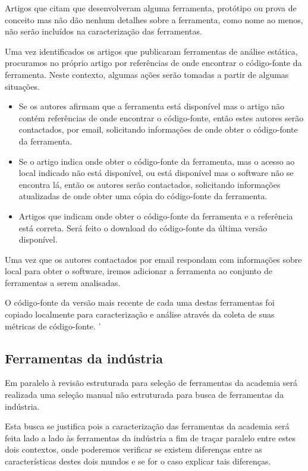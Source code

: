 Artigos que citam que desenvolveram alguma ferramenta, protótipo ou prova de
conceito mas não dão nenhum detalhes sobre a ferramenta, como nome ao menos,
não serão incluídos na caracterização das ferramentas.

Uma vez identificados os artigos que publicaram ferramentas de análise
estática, procuramos no próprio artigo por referências de onde encontrar o
código-fonte da ferramenta. Neste contexto, algumas ações serão tomadas a
partir de algumas situações.

\begin{itemize}

  \item Se os autores afirmam que a ferramenta está disponível mas o artigo
    não contém referências de onde encontrar o código-fonte, então estes
    autores serão contactados, por email, solicitando informações de onde
    obter o código-fonte da ferramenta.

  \item Se o artigo indica onde obter o código-fonte da ferramenta, mas o acesso ao local
    indicado não está disponível, ou está disponível mas o software não se
    encontra lá, então os autores serão contactados, solicitando informações
    atualizadas de onde obter uma cópia do código-fonte da ferramenta.

  \item Artigos que indicam onde obter o código-fonte da ferramenta e a referência
    está correta. Será feito o download do código-fonte da última versão
    disponível.

\end{itemize}

Uma vez que os autores contactados por email respondam com informações sobre
local para obter o software, iremos adicionar a ferramenta ao conjunto de ferramentas
a serem analisadas.

O código-fonte da versão mais recente de cada uma destas ferramentas foi
copiado localmente para caracterização e análise através da coleta de suas
métricas de código-fonte.
'
\subsection{Ferramentas da indústria}

Em paralelo à revisão estruturada para seleção de ferramentas da academia
será realizada uma seleção manual não estruturada para busca de ferramentas da indústria.

Esta busca se justifica pois a caracterização das ferramentas da academia será feita lado a
lado às ferramentas da indústria a fim de traçar paralelo entre estes dois contextos, onde
poderemos verificar se existem diferenças entre as características destes dois mundos e
se for o caso explicar tais diferenças.

